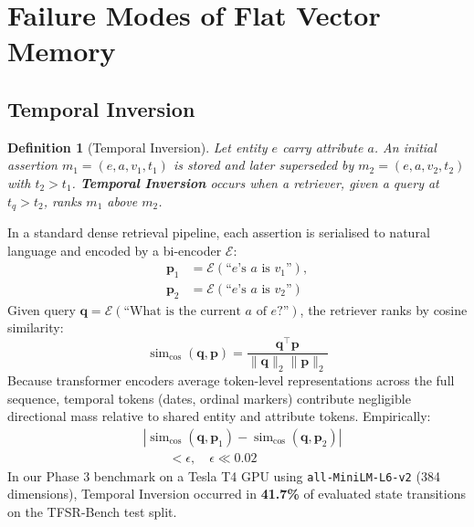\documentclass[11pt,a4paper,twocolumn]{article}
\newcommand{\simcos}{\operatorname{sim}_{\text{cos}}}
\newcommand{\ticol}{\textbf{Temporal Inversion}}
\newtheorem{definition}{Definition}
\begin{document}
\section{Failure Modes of Flat Vector Memory}
\label{sec:failures}

\subsection{Temporal Inversion}
\label{sec:temporal_inversion}

\begin{definition}[Temporal Inversion]
Let entity $e$ carry attribute $a$.  An initial assertion $m_1 =
(e, a, v_1, t_1)$ is stored and later superseded by $m_2 = (e, a, v_2,
t_2)$ with $t_2 > t_1$.  \ticol{} occurs when a retriever, given a
query at $t_q > t_2$, ranks $m_1$ above $m_2$.
\end{definition}

In a standard dense retrieval pipeline, each assertion is serialised
to natural language and encoded by a bi-encoder $\mathcal{E}$:
\begin{equation}
\begin{aligned}
\mathbf{p}_1 &= \mathcal{E}(\text{``}e\text{'s } a \text{ is } v_1
\text{''}), \\[4pt]
\mathbf{p}_2 &= \mathcal{E}(\text{``}e\text{'s } a \text{ is } v_2
\text{''})
\end{aligned}
\label{eq:enc}
\end{equation}
Given query $\mathbf{q} = \mathcal{E}(\text{``What is the current }
a \text{ of } e\text{?''})$, the retriever ranks by cosine similarity:
\begin{equation}
  \simcos(\mathbf{q}, \mathbf{p}) =
  \frac{\mathbf{q}^\top \mathbf{p}}{\|\mathbf{q}\|_2 \|\mathbf{p}\|_2}
  \label{eq:cosine}
\end{equation}
Because transformer encoders average token-level representations across
the full sequence, temporal tokens (dates, ordinal markers) contribute
negligible directional mass relative to shared entity and attribute
tokens.  Empirically:
\begin{equation}
\begin{aligned}
&|\simcos(\mathbf{q},\mathbf{p}_1)
- \simcos(\mathbf{q},\mathbf{p}_2)|\\
&\qquad < \epsilon, \quad \epsilon \ll 0.02
\end{aligned}
\label{eq:inv_bound}
\end{equation}
In our Phase 3 benchmark on a Tesla T4 GPU using
\texttt{all-MiniLM-L6-v2} (384 dimensions), Temporal Inversion occurred
in \textbf{41.7\%} of evaluated state transitions on the TFSR-Bench
test split.
\end{document}
